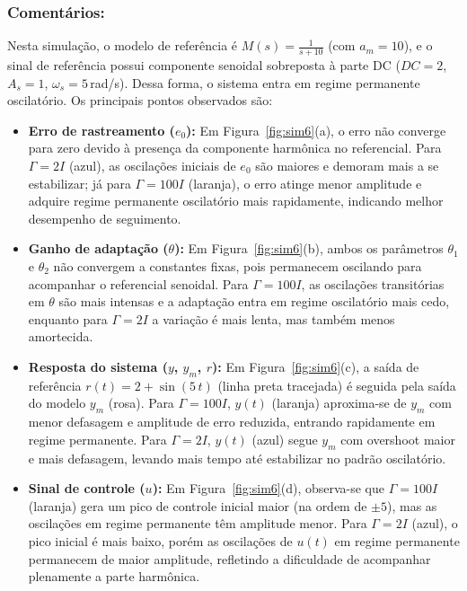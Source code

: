\documentclass[10pt]{article}
\begin{document}
\subsubsection{Comentários:}

Nesta simulação, o modelo de referência é $M(s) = \frac{1}{s+10}$ (com $a_m=10$), e o sinal de referência possui componente senoidal sobreposta à parte DC ($DC = 2$, $A_s = 1$, $\omega_s = 5\,$rad/s). Dessa forma, o sistema entra em regime permanente oscilatório. Os principais pontos observados são:

\begin{itemize}
    \item \textbf{Erro de rastreamento ($e_0$):} Em Figura~\ref{fig:sim6}(a), o erro não converge para zero devido à presença da componente harmônica no referencial. Para $\Gamma = 2I$ (azul), as oscilações iniciais de $e_0$ são maiores e demoram mais a se estabilizar; já para $\Gamma = 100I$ (laranja), o erro atinge menor amplitude e adquire regime permanente oscilatório mais rapidamente, indicando melhor desempenho de seguimento.

    \item \textbf{Ganho de adaptação ($\theta$):} Em Figura~\ref{fig:sim6}(b), ambos os parâmetros $\theta_1$ e $\theta_2$ não convergem a constantes fixas, pois permanecem oscilando para acompanhar o referencial senoidal. Para $\Gamma = 100I$, as oscilações transitórias em $\theta$ são mais intensas e a adaptação entra em regime oscilatório mais cedo, enquanto para $\Gamma = 2I$ a variação é mais lenta, mas também menos amortecida.

    \item \textbf{Resposta do sistema ($y$, $y_m$, $r$):} Em Figura~\ref{fig:sim6}(c), a saída de referência $r(t) = 2 + \sin(5\,t)$ (linha preta tracejada) é seguida pela saída do modelo $y_m$ (rosa). Para $\Gamma = 100I$, $y(t)$ (laranja) aproxima-se de $y_m$ com menor defasagem e amplitude de erro reduzida, entrando rapidamente em regime permanente. Para $\Gamma = 2I$, $y(t)$ (azul) segue $y_m$ com overshoot maior e mais defasagem, levando mais tempo até estabilizar no padrão oscilatório.

    \item \textbf{Sinal de controle ($u$):} Em Figura~\ref{fig:sim6}(d), observa-se que $\Gamma = 100I$ (laranja) gera um pico de controle inicial maior (na ordem de $\pm 5$), mas as oscilações em regime permanente têm amplitude menor. Para $\Gamma = 2I$ (azul), o pico inicial é mais baixo, porém as oscilações de $u(t)$ em regime permanente permanecem de maior amplitude, refletindo a dificuldade de acompanhar plenamente a parte harmônica.


\end{itemize}
\end{document}
